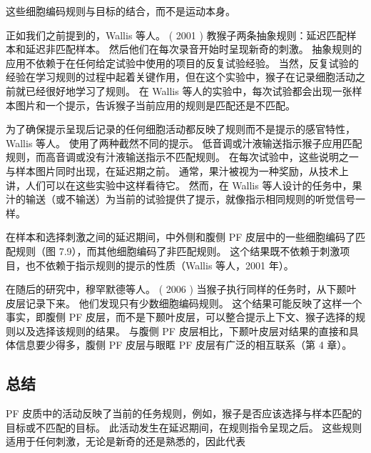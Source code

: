  这些细胞编码规则与目标的结合，而不是运动本身。
\par
 正如我们之前提到的，Wallis 等人。 ( 2001 ) 教猴子两条抽象规则：延迟匹配样本和延迟非匹配样本。 
 然后他们在每次录音开始时呈现新奇的刺激。 抽象规则的应用不依赖于在任何给定试验中使用的项目的反复试验经验。 
 当然，反复试验的经验在学习规则的过程中起着关键作用，但在这个实验中，猴子在记录细胞活动之前就已经很好地学习了规则。 
 在 Wallis 等人的实验中，每次试验都会出现一张样本图片和一个提示，告诉猴子当前应用的规则是匹配还是不匹配。
\par
为了确保提示呈现后记录的任何细胞活动都反映了规则而不是提示的感官特性，Wallis 等人。 使用了两种截然不同的提示。 
低音调或汁液输送指示猴子应用匹配规则，而高音调或没有汁液输送指示不匹配规则。 
在每次试验中，这些说明之一与样本图片同时出现，在延迟期之前。 
通常，果汁被视为一种奖励，从技术上讲，人们可以在这些实验中这样看待它。 
然而，在 Wallis 等人设计的任务中，果汁的输送（或不输送）为当前的试验提供了提示，就像指示相同规则的听觉信号一样。
\par
在样本和选择刺激之间的延迟期间，中外侧和腹侧 PF 皮层中的一些细胞编码了匹配规则（图 7.9），而其他细胞编码了非匹配规则。 这个结果既不依赖于刺激项目，也不依赖于指示规则的提示的性质（Wallis 等人，2001 年）。
\par
在随后的研究中，穆罕默德等人。 ( 2006 ) 当猴子执行同样的任务时，从下颞叶皮层记录下来。 
他们发现只有少数细胞编码规则。 这个结果可能反映了这样一个事实，即腹侧 PF 皮层，而不是下颞叶皮层，可以整合提示上下文、猴子选择的规则以及选择该规则的结果。 
与腹侧 PF 皮层相比，下颞叶皮层对结果的直接和具体信息要少得多，腹侧 PF 皮层与眼眶 PF 皮层有广泛的相互联系（第 4 章）。
\subsection{总结}
\par
PF 皮质中的活动反映了当前的任务规则，例如，猴子是否应该选择与样本匹配的目标或不匹配的目标。 
此活动发生在延迟期间，在规则指令呈现之后。 
这些规则适用于任何刺激，无论是新奇的还是熟悉的，因此代表

